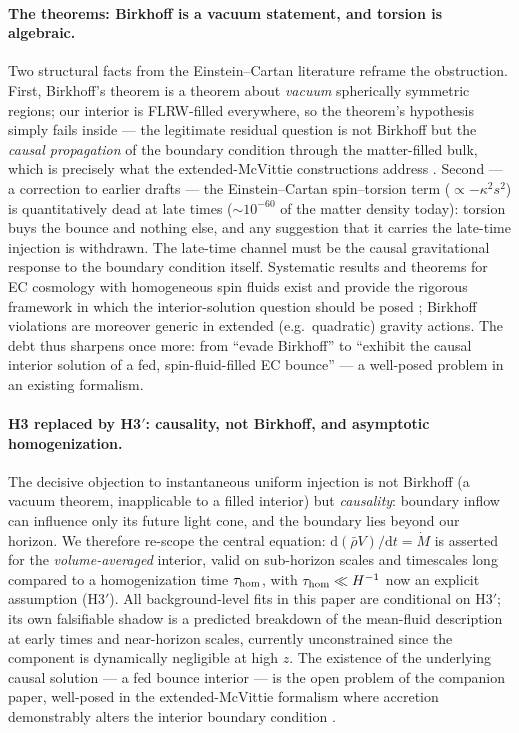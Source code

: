 \documentclass[11pt]{article}
\begin{document}
\paragraph{The theorems: Birkhoff is a vacuum statement, and torsion is algebraic.} Two structural facts from the Einstein--Cartan literature reframe the obstruction. First, Birkhoff's theorem is a theorem about \emph{vacuum} spherically symmetric regions; our interior is FLRW-filled everywhere, so the theorem's hypothesis simply fails inside --- the legitimate residual question is not Birkhoff but the \emph{causal propagation} of the boundary condition through the matter-filled bulk, which is precisely what the extended-McVittie constructions address \cite{Poplawski2024}. Second --- a correction to earlier drafts --- the Einstein--Cartan spin--torsion term ($\propto -\kappa^2 s^2$) is quantitatively dead at late times ($\sim 10^{-60}$ of the matter density today): torsion buys the bounce and nothing else, and any suggestion that it carries the late-time injection is withdrawn. The late-time channel must be the causal gravitational response to the boundary condition itself. Systematic results and theorems for EC cosmology with homogeneous spin fluids exist and provide the rigorous framework in which the interior-solution question should be posed \cite{ECtheorems}; Birkhoff violations are moreover generic in extended (e.g.\ quadratic) gravity actions. The debt thus sharpens once more: from ``evade Birkhoff'' to ``exhibit the causal interior solution of a fed, spin-fluid-filled EC bounce'' --- a well-posed problem in an existing formalism.

\paragraph{H3 replaced by H3$'$: causality, not Birkhoff, and asymptotic homogenization.} The decisive objection to instantaneous uniform injection is not Birkhoff (a vacuum theorem, inapplicable to a filled interior) but \emph{causality}: boundary inflow can influence only its future light cone, and the boundary lies beyond our horizon. We therefore re-scope the central equation: $\mathrm{d}(\bar\rho V)/\mathrm{d}t = \dot M$ is asserted for the \emph{volume-averaged} interior, valid on sub-horizon scales and timescales long compared to a homogenization time $\tau_{\rm hom}$, with $\tau_{\rm hom} \ll H^{-1}$ now an explicit assumption (H3$'$). All background-level fits in this paper are conditional on H3$'$; its own falsifiable shadow is a predicted breakdown of the mean-fluid description at early times and near-horizon scales, currently unconstrained since the component is dynamically negligible at high $z$. The existence of the underlying causal solution --- a fed bounce interior --- is the open problem of the companion paper, well-posed in the extended-McVittie formalism where accretion demonstrably alters the interior boundary condition \cite{Poplawski2024}.
\end{document}
